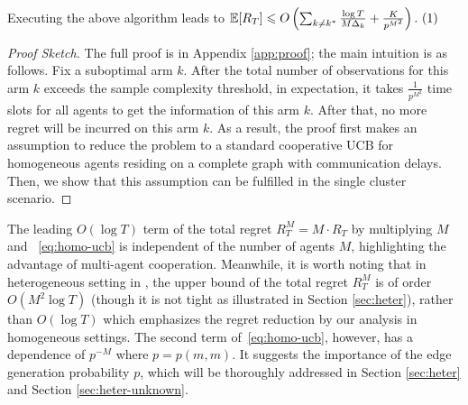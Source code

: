 
\begin{theorem}\label{thm:homo-ucb}
    Executing the above algorithm leads to $ \mathbb{E}[R_T] \le O\left(\sum_{k\neq k^*} \frac{\log T}{M\Delta_k}
        + \frac{K}{p^{M^2}} 
        \right).~\refstepcounter{equation}(\theequation)\label{eq:homo-ucb}$ 
\end{theorem}
\vspace{-5mm}
\begin{proof}[Proof Sketch]
    The full proof is in Appendix \ref{app:proof}; the main intuition is as follows. Fix a suboptimal arm \(k\). After the total number of observations for this arm \(k\) exceeds the sample complexity threshold, in expectation, it takes \(\frac{1}{p^{M^2}}\) time slots for all agents to get the information of this arm \(k\).
    After that, no more regret will be incurred on this arm \(k\). As a result, the proof first makes an assumption to reduce the problem to a standard cooperative UCB for homogeneous agents residing on a complete graph with communication delays.
    Then, we show that this assumption can be fulfilled in the single cluster scenario.
\end{proof}

The leading \(O(\log T)\) term of the total regret $R_T^M = M \cdot R_T$ by multiplying $M$ and ~\eqref{eq:homo-ucb} is independent of the number of agents \(M\), highlighting the advantage of multi-agent cooperation. Meanwhile, it is worth noting that in heterogeneous setting in \citep{xu2023decentralized}, the upper bound of the total regret $R_T^M$ is of order $O(M^2\log{T})$ (though it is not tight as illustrated in Section \ref{sec:heter}), rather than $O(\log{T})$ which emphasizes the regret reduction by our analysis in homogeneous settings. The second term of~\eqref{eq:homo-ucb}, however, has a dependence of \(p^{-M}\) where $p = p(m,m)$. It suggests the importance of the edge generation probability \(p\), which will be thoroughly addressed in Section \ref{sec:heter} and Section \ref{sec:heter-unknown}.



